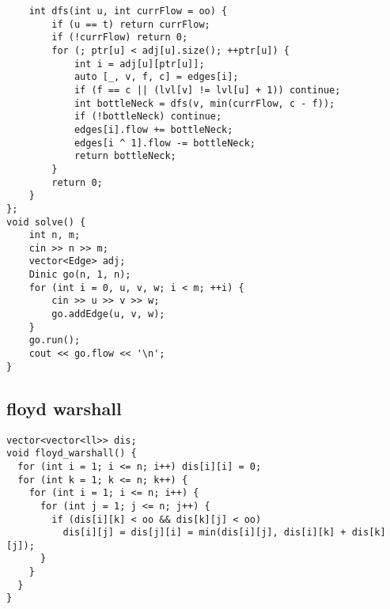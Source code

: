 \documentclass[twoside]{article}
\begin{document}
\begin{multicols*}{2}
\begin{verbatim}
    int dfs(int u, int currFlow = oo) {
        if (u == t) return currFlow;
        if (!currFlow) return 0;
        for (; ptr[u] < adj[u].size(); ++ptr[u]) {
            int i = adj[u][ptr[u]];
            auto [_, v, f, c] = edges[i];
            if (f == c || (lvl[v] != lvl[u] + 1)) continue;
            int bottleNeck = dfs(v, min(currFlow, c - f));
            if (!bottleNeck) continue;
            edges[i].flow += bottleNeck;
            edges[i ^ 1].flow -= bottleNeck;
            return bottleNeck;
        }
        return 0;
    }
};
void solve() {
    int n, m;
    cin >> n >> m;
    vector<Edge> adj;
    Dinic go(n, 1, n);
    for (int i = 0, u, v, w; i < m; ++i) {
        cin >> u >> v >> w;
        go.addEdge(u, v, w);
    }
    go.run();
    cout << go.flow << '\n';
}
\end{verbatim}

{
\subsection*{floyd warshall}
}
\begin{verbatim}
vector<vector<ll>> dis;
void floyd_warshall() {
  for (int i = 1; i <= n; i++) dis[i][i] = 0;
  for (int k = 1; k <= n; k++) {
    for (int i = 1; i <= n; i++) {
      for (int j = 1; j <= n; j++) {
        if (dis[i][k] < oo && dis[k][j] < oo)
          dis[i][j] = dis[j][i] = min(dis[i][j], dis[i][k] + dis[k][j]);
      }
    }
  }
}
\end{verbatim}

{
}
\end{multicols*}
\end{document}
